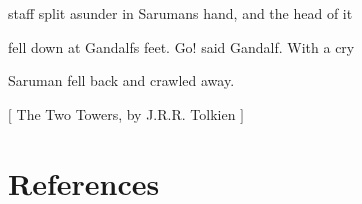 staff split asunder in Saruman\textquotesingle{}s hand, and the head of it$\text{ }$\newline{}

fell down at Gandalf\textquotesingle{}s feet.  \textquotesingle{}Go!\textquotesingle{} said Gandalf. With a cry$\text{ }$\newline{}

Saruman fell back and crawled away.$\text{ }$\newline{}




{$\text{[}$} The Two Towers, by J.R.R. Tolkien {$\text{]}$} 

\section{References}
\label{25}

